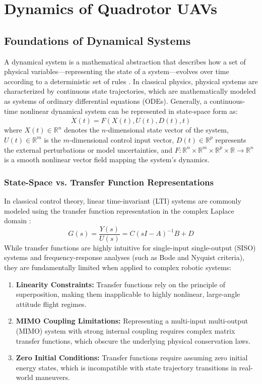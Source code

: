 \chapter{Dynamics of Quadrotor UAVs}
\label{ch:dynamics}

\section{Foundations of Dynamical Systems}
A dynamical system is a mathematical abstraction that describes how a set of physical variables—representing the state of a system—evolves over time according to a deterministic set of rules \cite{ref_56}. In classical physics, physical systems are characterized by continuous state trajectories, which are mathematically modeled as systems of ordinary differential equations (ODEs). Generally, a continuous-time nonlinear dynamical system can be represented in state-space form as:
\begin{equation}
\dot{X}(t) = F(X(t), U(t), D(t), t)
\end{equation}
where $X(t) \in \mathbb{R}^n$ denotes the $n$-dimensional state vector of the system, $U(t) \in \mathbb{R}^m$ is the $m$-dimensional control input vector, $D(t) \in \mathbb{R}^p$ represents the external perturbations or model uncertainties, and $F: \mathbb{R}^n \times \mathbb{R}^m \times \mathbb{R}^p \times \mathbb{R} \to \mathbb{R}^n$ is a smooth nonlinear vector field mapping the system's dynamics.

\subsection{State-Space vs. Transfer Function Representations}
In classical control theory, linear time-invariant (LTI) systems are commonly modeled using the transfer function representation in the complex Laplace domain \cite{ref_62}:
\begin{equation}
G(s) = \frac{Y(s)}{U(s)} = C(sI - A)^{-1}B + D
\end{equation}
While transfer functions are highly intuitive for single-input single-output (SISO) systems and frequency-response analyses (such as Bode and Nyquist criteria), they are fundamentally limited when applied to complex robotic systems:
\begin{enumerate}
    \item \textbf{Linearity Constraints:} Transfer functions rely on the principle of superposition, making them inapplicable to highly nonlinear, large-angle attitude flight regimes.
    \item \textbf{MIMO Coupling Limitations:} Representing a multi-input multi-output (MIMO) system with strong internal coupling requires complex matrix transfer functions, which obscure the underlying physical conservation laws.
    \item \textbf{Zero Initial Conditions:} Transfer functions require assuming zero initial energy states, which is incompatible with state trajectory transitions in real-world maneuvers.
\end{enumerate}

